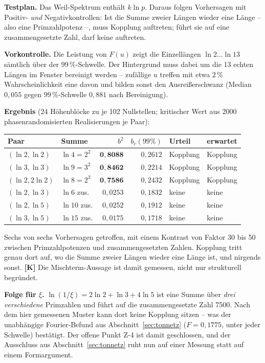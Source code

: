 \textbf{Testplan.} Das Weil-Spektrum enth\"alt $k\ln p$. Daraus folgen
Vorhersagen mit Positiv- \emph{und} Negativkontrollen: Ist die Summe
zweier L\"angen wieder eine L\"ange -- also eine Primzahlpotenz --, muss
Kopplung auftreten; f\"uhrt sie auf eine zusammengesetzte Zahl, darf
keine auftreten.

\textbf{Vorkontrolle.} Die Leistung von $F(u)$ zeigt die Einzell\"angen
$\ln 2 \ldots \ln 13$ s\"amtlich \"uber der 99\,\%-Schwelle. Der
Hintergrund muss dabei um die 13 echten L\"angen im Fenster bereinigt
werden -- zuf\"allige $u$ treffen mit etwa 2\,\% Wahrscheinlichkeit eine
davon und bilden sonst den Ausrei\ss erschwanz (Median $0{,}055$ gegen
$99\,\%$-Schwelle $0{,}881$ nach Bereinigung).

\textbf{Ergebnis} (24 H\"ohenbl\"ocke zu je 102 Nullstellen; kritischer
Wert aus 2000 phasenrandomisierten Realisierungen je Paar):

\begin{center}
\begin{tabular}{llrrll}
\toprule
Paar & Summe & $b^2$ & $b_c(99\%)$ & Urteil & erwartet \\
\midrule
$(\ln2,\ln2)$ & $\ln 4 = 2^2$ & $\mathbf{0{,}8088}$ & $0{,}2612$ & Kopplung & Kopplung \\
$(\ln3,\ln3)$ & $\ln 9 = 3^2$ & $\mathbf{0{,}8462}$ & $0{,}2214$ & Kopplung & Kopplung \\
$(\ln2,2\ln2)$ & $\ln 8 = 2^3$ & $\mathbf{0{,}7586}$ & $0{,}2432$ & Kopplung & Kopplung \\
$(\ln2,\ln3)$ & $\ln 6$ zus. & $0{,}0253$ & $0{,}1832$ & keine & keine \\
$(\ln2,\ln5)$ & $\ln 10$ zus. & $0{,}0252$ & $0{,}1912$ & keine & keine \\
$(\ln3,\ln5)$ & $\ln 15$ zus. & $0{,}0175$ & $0{,}1718$ & keine & keine \\
\bottomrule
\end{tabular}
\end{center}

\begin{keyresult}
Sechs von sechs Vorhersagen getroffen, mit einem Kontrast von Faktor
30 bis 50 zwischen Primzahlpotenzen und zusammengesetzten Zahlen.
Kopplung tritt genau dort auf, wo die Summe zweier L\"angen wieder eine
L\"ange ist, und nirgends sonst. \textbf{[K]} Die Mischterm-Aussage ist
damit gemessen, nicht nur strukturell begr\"undet.
\end{keyresult}

\textbf{Folge f\"ur $\xi$.} $\ln(1/\xi) = 2\ln2 + \ln3 + 4\ln5$ ist eine
Summe \"uber \emph{drei verschiedene} Primzahlen und f\"uhrt auf die
zusammengesetzte Zahl 7500. Nach dem hier gemessenen Muster kann dort
keine Kopplung sitzen -- was der unabh\"angige Fourier-Befund aus
Abschnitt~\ref{sec:tonnetz} ($F = 0{,}1775$, unter jeder Schwelle)
best\"atigt. Der offene Punkt Z-4 ist damit geschlossen, und der
Ausschluss aus Abschnitt~\ref{sec:tonnetz} ruht nun auf einer Messung
statt auf einem Formargument.

